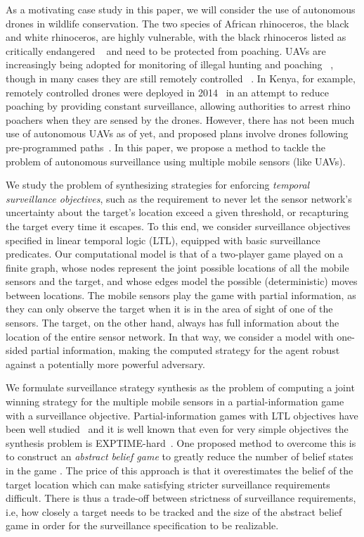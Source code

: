 As a motivating case study in this paper, we will consider the use of autonomous drones in wildlife conservation. The two species of African rhinoceros, the black and white rhinoceros, are highly vulnerable, with the black rhinoceros listed as critically endangered ~\cite{mulero2014remotely} and need to be protected from poaching. UAVs are increasingly being adopted for monitoring of illegal hunting and poaching ~\cite{schiffman2014drones}, though in many cases they are still remotely controlled ~\cite{mulero2014remotely}. In Kenya, for example, remotely controlled drones were deployed in 2014~\cite{Kenya} in an attempt to reduce poaching  by providing constant surveillance, allowing authorities to arrest rhino poachers when they are sensed by the drones. However, there has not been much use of autonomous UAVs as of yet, and proposed plans involve drones following pre-programmed paths~\cite{Koh12}. In this paper, we propose a method to tackle the problem of autonomous surveillance using multiple mobile sensors (like UAVs). 

We study the problem of synthesizing strategies for enforcing \emph{temporal surveillance objectives}, such as the requirement to never let the sensor network's uncertainty about the target's location exceed a given threshold, or recapturing the target every time it escapes. To this end, we consider surveillance objectives specified in linear temporal logic (LTL), equipped with basic surveillance predicates. Our computational model is that of a two-player game played on a finite graph, whose nodes represent the joint possible locations of all the mobile sensors and the target, and whose edges model the possible (deterministic) moves between locations. The mobile sensors play the game with partial information, as they can only observe the target when  it is in the area of sight of one of the sensors. The target, on the other hand, always has full information about the location of the entire sensor network. In that way, we consider a model with one-sided partial information, making the computed strategy for the agent robust against a potentially more powerful adversary. 

We formulate surveillance strategy synthesis as the problem of computing a joint winning strategy for the multiple mobile sensors in a partial-information game with a surveillance objective. Partial-information games with LTL objectives have been well studied~\cite{DoyenR11,Chatterjee2013} and it is well known that even for very simple objectives the synthesis problem is EXPTIME-hard~\cite{Reif84,BerwangerD08}. One proposed method to overcome this is to construct an \emph{abstract belief game} to greatly reduce the number of belief states in the game \cite{Bhar16}. The price of this approach is that it overestimates the belief of the target location which can make satisfying stricter surveillance requirements difficult. There is thus a trade-off between strictness of surveillance requirements, i.e, how closely a target needs to be tracked and the size of the abstract belief game in order for the surveillance specification to be realizable. 

